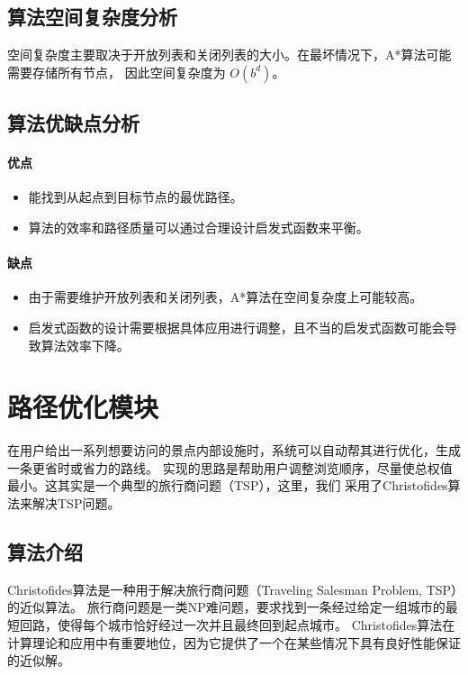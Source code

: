 \documentclass{report}
\begin{document}
\subsection{算法空间复杂度分析}
空间复杂度主要取决于开放列表和关闭列表的大小。在最坏情况下，A*算法可能需要存储所有节点，
因此空间复杂度为 $O(b^d)$。
\subsection{算法优缺点分析}
\paragraph*{优点}
\begin{itemize}
    \item 能找到从起点到目标节点的最优路径。
    \item 算法的效率和路径质量可以通过合理设计启发式函数来平衡。
\end{itemize}
\paragraph*{缺点}
\begin{itemize}
    \item 由于需要维护开放列表和关闭列表，A*算法在空间复杂度上可能较高。
    \item 启发式函数的设计需要根据具体应用进行调整，且不当的启发式函数可能会导致算法效率下降。
\end{itemize}

\section{路径优化模块}
在用户给出一系列想要访问的景点内部设施时，系统可以自动帮其进行优化，生成一条更省时或省力的路线。
实现的思路是帮助用户调整浏览顺序，尽量使总权值最小。这其实是一个典型的旅行商问题（TSP），这里，我们
采用了Christofides算法来解决TSP问题。
\subsection{算法介绍}
Christofides算法是一种用于解决旅行商问题（Traveling Salesman Problem, TSP）的近似算法。
旅行商问题是一类NP难问题，要求找到一条经过给定一组城市的最短回路，使得每个城市恰好经过一次并且最终回到起点城市。
Christofides算法在计算理论和应用中有重要地位，因为它提供了一个在某些情况下具有良好性能保证的近似解。
\end{document}
